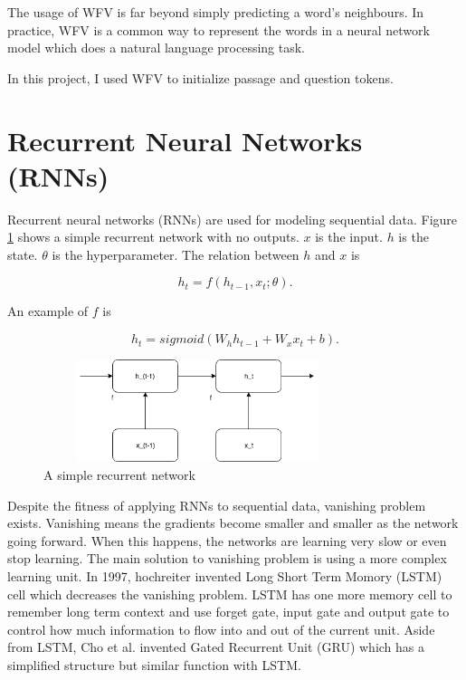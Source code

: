\documentclass[modernstyle,12pt]{sjsuthesis}
\theoremstyle{definition}
\begin{document}
The usage of WFV is far beyond simply predicting a word's neighbours. In practice, WFV is a common way to represent the words in a neural network model which does a natural language processing task.

In this project, I used WFV to initialize passage and question tokens.

\section{Recurrent Neural Networks (RNNs)}\label{sect:rnn}

Recurrent neural networks (RNNs) \cite{rumelhart1986learning} are used for modeling sequential data. Figure \ref{f:rnnWithNoOutputs} shows a simple recurrent network with no outputs. $x$ is the input. $h$ is the state. $\theta$ is the hyperparameter. The relation between $h$ and $x$ is

$$h_t = f(h_{t-1}, x_t; \theta).$$

An example of $f$ is

$$h_t = sigmoid(W_h h_{t-1} + W_x x_t + b).$$

\begin{figure}[htbp]\centering
  \includegraphics[width=9cm, height=3cm]{figures/rnnWithNoOutputs}
  \caption{A simple recurrent network}
  \label{f:rnnWithNoOutputs}
\end{figure}



Despite the fitness of applying RNNs to sequential data, vanishing problem exists. Vanishing means the gradients become smaller and smaller as the network going forward. When this happens, the networks are learning very slow or even stop learning. The main solution to vanishing problem is using a more complex learning unit. In 1997, hochreiter invented Long Short Term Momory (LSTM) cell \cite{hochreiter1997long} which decreases the vanishing problem. LSTM has one more memory cell to remember long term context and use forget gate, input gate and output gate to control how much information to flow into and out of the current unit. Aside from LSTM, Cho et al. invented Gated Recurrent Unit (GRU)\cite{cho2014learning} which has a simplified structure but similar function with LSTM.
\end{document}
